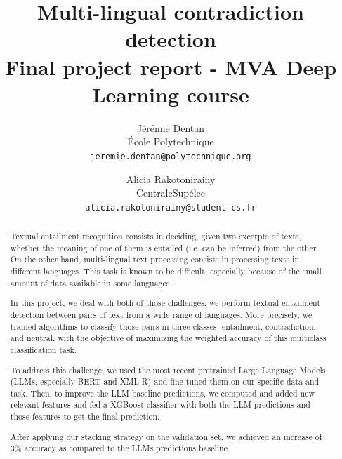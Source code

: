 \documentclass[final]{cvpr}
\begin{document}
\title{Multi-lingual contradiction detection \\ \small{Final project report - MVA Deep Learning course}}

\author{Jérémie Dentan\\
École Polytechnique\\
{\tt\small jeremie.dentan@polytechnique.org}
\and
Alicia Rakotonirainy\\
CentraleSupélec\\
{\tt\small alicia.rakotonirainy@student-cs.fr}
}

\maketitle


\begin{abstract}
    Textual entailment recognition consists in deciding, given two excerpts of texts, whether the meaning of one of them is entailed (i.e. can be inferred) from the other. On the other hand, multi-lingual text processing consists in processing texts in different languages. This task is known to be difficult, especially because of the small amount of data available in some languages.

    In this project, we deal with both of those challenges: we perform textual entailment detection between pairs of text from a wide range of languages. More precisely, we trained algorithms to classify those pairs in three classes: entailment, contradiction, and neutral, with the objective of maximizing the weighted accuracy of this multiclass classification task.
    
    To address this challenge, we used the most recent pretrained Large Language Models (LLMs, especially BERT and XML-R) and fine-tuned them on our specific data and task. Then, to improve the LLM baseline predictions, we computed and added new relevant features and fed a XGBoost classifier with both the LLM predictions and those features to get the final prediction. 

    After applying our stacking strategy on the validation set, we achieved an increase of 3\% accuracy as compared to the LLMs predictions baseline.

\end{abstract}
\end{document}
